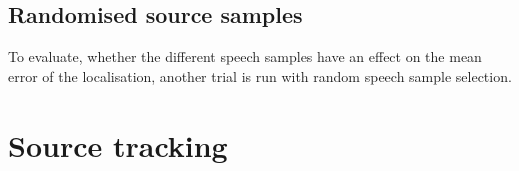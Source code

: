 \subsection*{Randomised source samples}
To evaluate, whether the different speech samples have an effect on the mean error of the localisation, another trial is run with random speech sample selection.








\section{Source tracking}